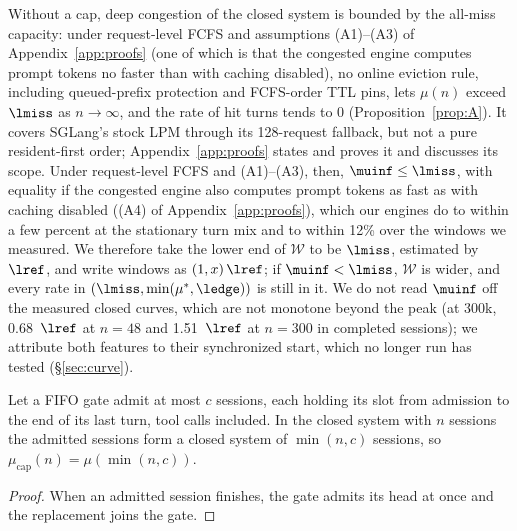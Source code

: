 Without a cap, deep congestion of the closed system is bounded by the all-miss capacity: under request-level FCFS and assumptions (A1)--(A3) of Appendix~\ref{app:proofs} (one of which is that the congested engine computes prompt tokens no faster than with caching disabled), no online eviction rule, including queued-prefix protection and FCFS-order TTL pins, lets $\mu(n)$ exceed $\lmiss$ as $n\to\infty$, and the rate of hit turns tends to 0 (Proposition~\ref{prop:A}). It covers SGLang's stock LPM through its 128-request fallback, but not a pure resident-first order; Appendix~\ref{app:proofs} states and proves it and discusses its scope. Under request-level FCFS and (A1)--(A3), then, $\muinf\le\lmiss$, with equality if the congested engine also computes prompt tokens as fast as with caching disabled ((A4) of Appendix~\ref{app:proofs}), which our engines do to within a few percent at the stationary turn mix and to within 12\% over the windows we measured. We therefore take the lower end of $\mathcal W$ to be $\lmiss$, estimated by $\lref$, and write windows as $(1,x)\,\lref$; if $\muinf<\lmiss$, $\mathcal W$ is wider, and every rate in $(\lmiss,\min(\mu^*,\ledge))$ is still in it. We do not read $\muinf$ off the measured closed curves, which are not monotone beyond the peak (at 300k, 0.68~$\lref$ at $n=48$ and 1.51~$\lref$ at $n=300$ in completed sessions); we attribute both features to their synchronized start, which no longer run has tested (\S\ref{sec:curve}).

\begin{proposition}\label{prop:cap}
Let a FIFO gate admit at most $c$ sessions, each holding its slot from admission to the end of its last turn, tool calls included. In the closed system with $n$ sessions the admitted sessions form a closed system of $\min(n,c)$ sessions, so $\mu_{\mathrm{cap}}(n)=\mu(\min(n,c))$.
\end{proposition}
\begin{proof}
When an admitted session finishes, the gate admits its head at once and the replacement joins the gate.
\end{proof}

